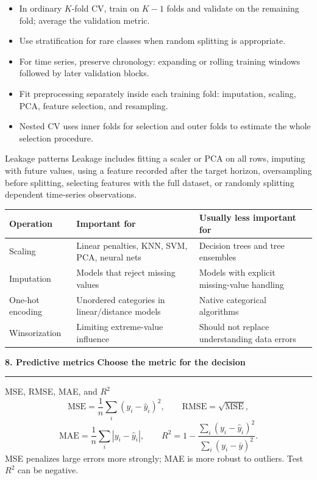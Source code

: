 \documentclass[10pt,a4paper]{article}
\newcommand{\sectionbanner}[2]{%
  \vspace{2mm}
  {\color{navy}\Large\bfseries #1}\hfill
  {\color{blue}\bfseries #2}
  \par\vspace{1mm}\color{line}\rule{\linewidth}{0.8pt}\color{ink}\vspace{2mm}
}
\newcommand{\subbanner}[1]{%
  \vspace{2mm}{\color{navy}\large\bfseries #1}\par
  \vspace{-1mm}{\color{line}\rule{\linewidth}{0.5pt}}\color{ink}\vspace{1mm}
}
\begin{document}
\begin{itemize}
  \item In ordinary $K$-fold CV, train on $K-1$ folds and validate on the remaining fold; average the validation metric.
  \item Use stratification for rare classes when random splitting is appropriate.
  \item For time series, preserve chronology: expanding or rolling training windows followed by later validation blocks.
  \item Fit preprocessing separately inside each training fold: imputation, scaling, PCA, feature selection, and resampling.
  \item Nested CV uses inner folds for selection and outer folds to estimate the whole selection procedure.
\end{itemize}

\begin{trapbox}{Leakage patterns}
Leakage includes fitting a scaler or PCA on all rows, imputing with future values, using a feature recorded after the target horizon, oversampling before splitting, selecting features with the full dataset, or randomly splitting dependent time-series observations.
\end{trapbox}

\subbanner{Preprocessing facts}

\begin{tabularx}{\linewidth}{@{}lXX@{}}
\toprule
Operation & Important for & Usually less important for \\
\midrule
Scaling & Linear penalties, KNN, SVM, PCA, neural nets & Decision trees and tree ensembles \\
Imputation & Models that reject missing values & Models with explicit missing-value handling \\
One-hot encoding & Unordered categories in linear/distance models & Native categorical algorithms \\
Winsorization & Limiting extreme-value influence & Should not replace understanding data errors \\
\bottomrule
\end{tabularx}

\sectionbanner{8. Predictive metrics}{Choose the metric for the decision}

\subbanner{Regression}

\begin{formulabox}{MSE, RMSE, MAE, and $R^2$}
\[
\mathrm{MSE}=\frac1n\sum_i(y_i-\hat y_i)^2,\qquad
\mathrm{RMSE}=\sqrt{\mathrm{MSE}},
\]
\[
\mathrm{MAE}=\frac1n\sum_i|y_i-\hat y_i|,\qquad
R^2=1-\frac{\sum_i(y_i-\hat y_i)^2}{\sum_i(y_i-\bar y)^2}.
\]
MSE penalizes large errors more strongly; MAE is more robust to outliers. Test $R^2$ can be negative.
\end{formulabox}
\end{document}
